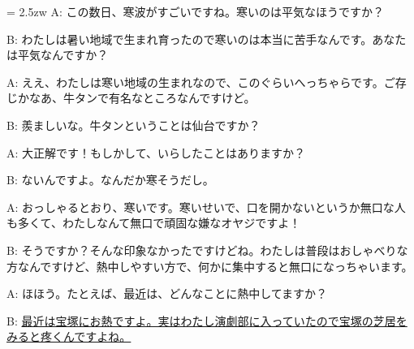 \documentclass[11pt]{amsart}
\title{}
\author{}
\newenvironment{hangall}[1]{\hangindent = 2.5zw\everypar{\hangindent = 2.5zw}}{}
\begin{document}
\maketitle
\begin{hangall}{}%
A: この数日、寒波がすごいですね。寒いのは平気なほうですか？

B: わたしは暑い地域で生まれ育ったので寒いのは本当に苦手なんです。あなたは平気なんですか？

A: ええ、わたしは寒い地域の生まれなので、このぐらいへっちゃらです。ご存じかなあ、牛タンで有名なところなんですけど。

B: 羨ましいな。牛タンということは仙台ですか？

A: 大正解です！もしかして、いらしたことはありますか？

B: ないんですよ。なんだか寒そうだし。

A: おっしゃるとおり、寒いです。寒いせいで、口を開かないというか無口な人も多くて、わたしなんて無口で頑固な嫌なオヤジですよ！

B: そうですか？そんな印象なかったですけどね。わたしは普段はおしゃべりな方なんですけど、熱中しやすい方で、何かに集中すると無口になっちゃいます。

A: ほほう。たとえば、最近は、どんなことに熱中してますか？

B: \ul{最近は宝塚にお熱ですよ。実はわたし演劇部に入っていたので宝塚の芝居をみると疼くんですよね。}\end{hangall}
\end{document}
